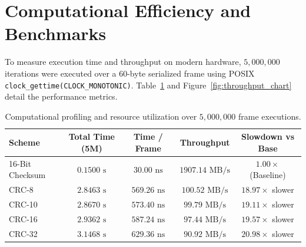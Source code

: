 \documentclass[11pt,a4paper]{article}
\begin{document}
\section{Computational Efficiency and Benchmarks}

To measure execution time and throughput on modern hardware, $5{,}000{,}000$ iterations were executed over a 60-byte serialized frame using POSIX \texttt{clock\_gettime(CLOCK\_MONOTONIC)}. Table~\ref{tab:profiling} and Figure~\ref{fig:throughput_chart} detail the performance metrics.

\begin{table}[H]
    \centering
    \small
    \setlength{\tabcolsep}{6pt}
    \begin{tabular}{lcccc}
        \toprule
        \textbf{Scheme} & \textbf{Total Time (5M)} & \textbf{Time / Frame} & \textbf{Throughput} & \textbf{Slowdown vs Base} \\
        \midrule
        16-Bit Checksum & $0.1500\text{ s}$ & $30.00\text{ ns}$  & $1907.14\text{ MB/s}$ & $1.00\times$ (Baseline) \\
        CRC-8           & $2.8463\text{ s}$ & $569.26\text{ ns}$ & $100.52\text{ MB/s}$  & $18.97\times$ slower \\
        CRC-10          & $2.8670\text{ s}$ & $573.40\text{ ns}$ & $99.79\text{ MB/s}$   & $19.11\times$ slower \\
        CRC-16          & $2.9362\text{ s}$ & $587.24\text{ ns}$ & $97.44\text{ MB/s}$   & $19.57\times$ slower \\
        CRC-32          & $3.1468\text{ s}$ & $629.36\text{ ns}$ & $90.92\text{ MB/s}$   & $20.98\times$ slower \\
        \bottomrule
    \end{tabular}
    \caption{Computational profiling and resource utilization over $5{,}000{,}000$ frame executions.}
    \label{tab:profiling}
\end{table}
\end{document}
